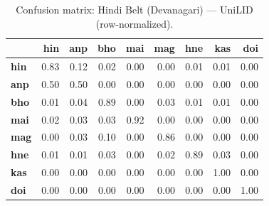 \begin{table}[htbp]
\centering
\small
\begin{tabular}{lrrrrrrrr}
\toprule
 & \textbf{hin} & \textbf{anp} & \textbf{bho} & \textbf{mai} & \textbf{mag} & \textbf{hne} & \textbf{kas} & \textbf{doi} \\
\midrule
\textbf{hin} & \cellcolor{blue!83}\color{white}0.83 & \cellcolor{blue!12}0.12 & \cellcolor{blue!1}0.02 & \cellcolor{blue!0}0.00 & \cellcolor{blue!0}0.00 & \cellcolor{blue!0}0.01 & \cellcolor{blue!0}0.01 & \cellcolor{blue!0}0.00 \\
\textbf{anp} & \cellcolor{blue!50}0.50 & \cellcolor{blue!50}0.50 & \cellcolor{blue!0}0.00 & \cellcolor{blue!0}0.00 & \cellcolor{blue!0}0.00 & \cellcolor{blue!0}0.00 & \cellcolor{blue!0}0.00 & \cellcolor{blue!0}0.00 \\
\textbf{bho} & \cellcolor{blue!1}0.01 & \cellcolor{blue!4}0.04 & \cellcolor{blue!89}\color{white}0.89 & \cellcolor{blue!0}0.00 & \cellcolor{blue!2}0.03 & \cellcolor{blue!1}0.01 & \cellcolor{blue!1}0.01 & \cellcolor{blue!0}0.00 \\
\textbf{mai} & \cellcolor{blue!1}0.02 & \cellcolor{blue!3}0.03 & \cellcolor{blue!3}0.03 & \cellcolor{blue!92}\color{white}0.92 & \cellcolor{blue!0}0.00 & \cellcolor{blue!0}0.00 & \cellcolor{blue!0}0.00 & \cellcolor{blue!0}0.00 \\
\textbf{mag} & \cellcolor{blue!0}0.00 & \cellcolor{blue!3}0.03 & \cellcolor{blue!10}0.10 & \cellcolor{blue!0}0.00 & \cellcolor{blue!86}\color{white}0.86 & \cellcolor{blue!0}0.00 & \cellcolor{blue!0}0.00 & \cellcolor{blue!0}0.00 \\
\textbf{hne} & \cellcolor{blue!1}0.01 & \cellcolor{blue!1}0.01 & \cellcolor{blue!3}0.03 & \cellcolor{blue!0}0.00 & \cellcolor{blue!2}0.02 & \cellcolor{blue!88}\color{white}0.89 & \cellcolor{blue!3}0.03 & \cellcolor{blue!0}0.00 \\
\textbf{kas} & \cellcolor{blue!0}0.00 & \cellcolor{blue!0}0.00 & \cellcolor{blue!0}0.00 & \cellcolor{blue!0}0.00 & \cellcolor{blue!0}0.00 & \cellcolor{blue!0}0.00 & \cellcolor{blue!100}\color{white}1.00 & \cellcolor{blue!0}0.00 \\
\textbf{doi} & \cellcolor{blue!0}0.00 & \cellcolor{blue!0}0.00 & \cellcolor{blue!0}0.00 & \cellcolor{blue!0}0.00 & \cellcolor{blue!0}0.00 & \cellcolor{blue!0}0.00 & \cellcolor{blue!0}0.00 & \cellcolor{blue!100}\color{white}1.00 \\
\bottomrule
\end{tabular}
\caption{Confusion matrix: Hindi Belt (Devanagari) — UniLID (row-normalized).}
\label{tab:cm-hindi_belt-unilid}
\end{table}

